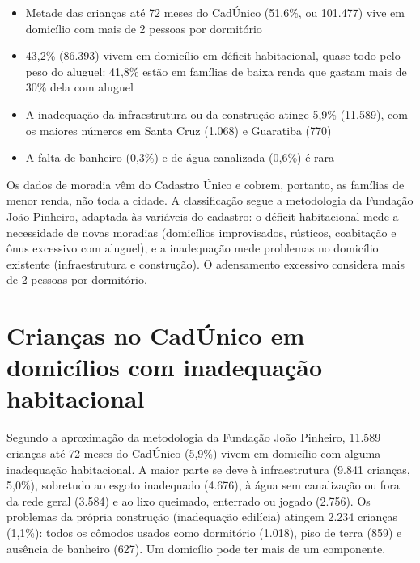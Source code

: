 \begin{achados}\begin{itemize}

\item Metade das crianças até 72 meses do CadÚnico (51,6\%, ou 101.477) vive em domicílio com mais de 2 pessoas por dormitório

\item 43,2\% (86.393) vivem em domicílio em déficit habitacional, quase todo pelo peso do aluguel: 41,8\% estão em famílias de baixa renda que gastam mais de 30\% dela com aluguel

\item A inadequação da infraestrutura ou da construção atinge 5,9\% (11.589), com os maiores números em Santa Cruz (1.068) e Guaratiba (770)

\item A falta de banheiro (0,3\%) e de água canalizada (0,6\%) é rara

\end{itemize}\end{achados}

Os dados de moradia vêm do Cadastro Único e cobrem, portanto, as famílias de menor renda, não toda a cidade. A classificação segue a metodologia da Fundação João Pinheiro, adaptada às variáveis do cadastro: o déficit habitacional mede a necessidade de novas moradias (domicílios improvisados, rústicos, coabitação e ônus excessivo com aluguel), e a inadequação mede problemas no domicílio existente (infraestrutura e construção). O adensamento excessivo considera mais de 2 pessoas por dormitório.

\section{Crianças no CadÚnico em domicílios com inadequação habitacional}


Segundo a aproximação da metodologia da Fundação João Pinheiro, 11.589 crianças até 72 meses do CadÚnico (5,9\%) vivem em domicílio com alguma inadequação habitacional. A maior parte se deve à infraestrutura (9.841 crianças, 5,0\%), sobretudo ao esgoto inadequado (4.676), à água sem canalização ou fora da rede geral (3.584) e ao lixo queimado, enterrado ou jogado (2.756). Os problemas da própria construção (inadequação edilícia) atingem 2.234 crianças (1,1\%): todos os cômodos usados como dormitório (1.018), piso de terra (859) e ausência de banheiro (627). Um domicílio pode ter mais de um componente.


